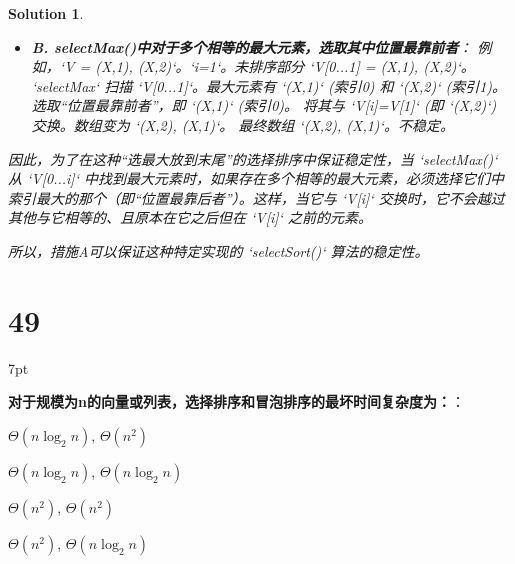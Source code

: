 \documentclass[UTF8]{report}
\newtheorem{solution}{Solution}
\theoremstyle{MyLineTheoremStyle} %
\theoremstyle{MyBlockTheoremStyle} %
\theoremstyle{MySubsubsectionStyle} %
\newenvironment{graybox}{%
        \def\FrameCommand{%
        \hspace{1pt}%
        {\color{gray}\small \vrule width 2pt}%
        {\color{graybox_color}\vrule width 4pt}%
        \colorbox{graybox_color}%
        }%
        \MakeFramed{\advance\hsize-\width\FrameRestore}%
        \noindent\hspace{-4.55pt}%
        \begin{adjustwidth}{}{7pt}%
        \vspace{2pt}\vspace{2pt}%
        }
        {%
        \vspace{2pt}\end{adjustwidth}\endMakeFramed%
        }
\begin{document}
\begin{solution}
\begin{itemize}
\begin{itemize}
        \item \textbf{B. selectMax()中对于多个相等的最大元素，选取其中位置最靠前者}：
        例如，`V = {(X,1), (X,2)}`。`i=1`。未排序部分 `V[0...1] = {(X,1), (X,2)}`。
        `selectMax` 扫描 `V[0...1]`。最大元素有 `(X,1)` (索引0) 和 `(X,2)` (索引1)。
        选取“位置最靠前者”，即 `(X,1)` (索引0)。
        将其与 `V[i]=V[1]` (即 `(X,2)`) 交换。数组变为 `{(X,2), (X,1)}`。
        最终数组 `{(X,2), (X,1)}`。不稳定。
    \end{itemize}
    因此，为了在这种“选最大放到末尾”的选择排序中保证稳定性，当 `selectMax()` 从 `V[0...i]` 中找到最大元素时，如果存在多个相等的最大元素，必须选择它们中索引最大的那个（即“位置最靠后者”）。这样，当它与 `V[i]` 交换时，它不会越过其他与它相等的、且原本在它之后但在 `V[i]` 之前的元素。
\end{itemize}
所以，措施A可以保证这种特定实现的 `selectSort()` 算法的稳定性。
\end{solution}

\section*{49}

\begin{graybox}
\textbf{对于规模为n的向量或列表，选择排序和冒泡排序的最坏时间复杂度为：}：
\begin{circledenum}
    \item $\Theta(n\log_{2}n)$, $\Theta(n^2)$
    \item $\Theta(n\log_{2}n)$, $\Theta(n\log_{2}n)$
    \item $\Theta(n^2)$, $\Theta(n^2)$
    \item $\Theta(n^2)$, $\Theta(n\log_{2}n)$
\end{circledenum}
\end{graybox}
\end{document}
